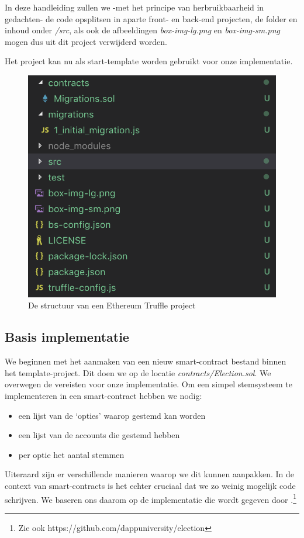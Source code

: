 	In deze handleiding zullen we  -met het principe van herbruikbaarheid in gedachten- de code opsplitsen in aparte front- en back-end projecten, de folder en inhoud onder \textit{\slash src}, als ook de afbeeldingen \textit{box-img-lg.png} en \textit{box-img-sm.png} mogen dus uit dit project verwijderd worden.
	
	Het project kan nu als start-template worden gebruikt voor onze implementatie.
	
	\begin{figure}
		\centering
		\includegraphics[width=\linewidth/2]{img/truffle-template.png}
		\caption{De structuur van een Ethereum Truffle project}
		\label{fig:truffle-template}
	\end{figure}
	
	\subsection{Basis implementatie}
	We beginnen met het aanmaken van een nieuw smart-contract bestand binnen het template-project. Dit doen we op de locatie \textit{contracts\slash Election.sol}. We overwegen de vereisten voor onze implementatie. Om een simpel stemsysteem te implementeren in een smart-contract hebben we nodig:
	\begin{itemize}
		\item een lijst van de `opties' waarop gestemd kan worden
		\item een lijst van de accounts die gestemd hebben
		\item per optie het aantal stemmen
	\end{itemize}
	Uiteraard zijn er verschillende manieren waarop we dit kunnen aanpakken. In de context van smart-contracts is het echter cruciaal dat we zo weinig mogelijk code schrijven. We baseren ons daarom op de implementatie die wordt gegeven door \textcite{McCubin2019}.\footnote{Zie ook https://github.com/dappuniversity/election}
	
